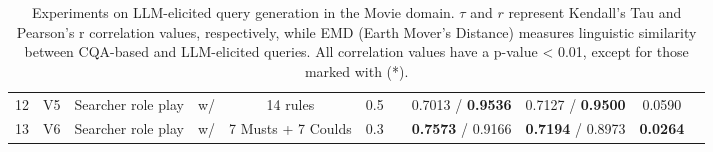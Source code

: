\begin{table*}[]
\begin{tabular}{ccccccc c ccc}
12 & V5 & Searcher role play & w/   & 14 rules               & 0.5 && 0.7013 / \textbf{0.9536} & 0.7127 / \textbf{0.9500} & 0.0590   \\
13 & V6 & Searcher role play & w/   & 7 Musts + 7 Coulds     & 0.3 && \textbf{0.7573} / 0.9166 & \textbf{0.7194} / 0.8973 & \textbf{0.0264} 
\end{tabular}
\caption{
Experiments on LLM-elicited query generation in the Movie domain.
$\tau$ and $r$ represent Kendall's Tau and Pearson's r correlation values, respectively, while EMD (Earth Mover’s Distance) measures linguistic similarity between CQA-based and LLM-elicited queries. All correlation values have a p-value < 0.01, except for those marked with (*).
}
\label{tab:prompt-versions}
\end{table*}